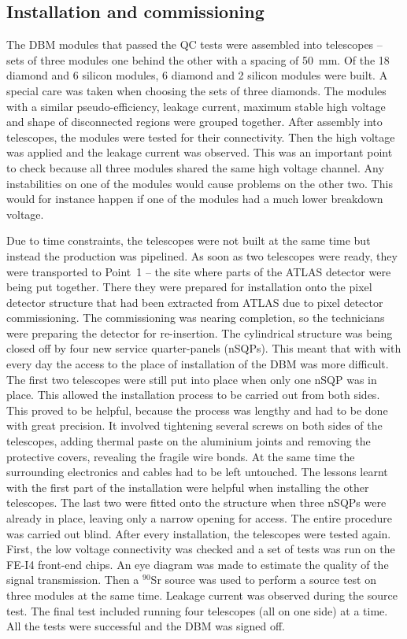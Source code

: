 \subsection{Installation and commissioning}
The DBM modules that passed the QC tests were assembled into telescopes -- sets of three modules one behind the other with a spacing of 50~mm. Of the 18 diamond and 6 silicon modules, 6 diamond and 2 silicon modules were built. A special care was taken when choosing the sets of three diamonds. The modules with a similar pseudo-efficiency, leakage current, maximum stable high voltage and shape of disconnected regions were grouped together. After assembly into telescopes, the modules were tested for their connectivity. Then the high voltage was applied and the leakage current was observed. This was an important point to check because all three modules shared the same high voltage channel. Any instabilities on one of the modules would cause problems on the other two. This would for instance happen if one of the modules had a much lower breakdown voltage.

Due to time constraints, the telescopes were not built at the same time but instead the production was pipelined. As soon as two telescopes were ready, they were transported to Point~1 -- the site where parts of the ATLAS detector were being put together. There they were prepared for installation onto the pixel detector structure that had been extracted from ATLAS due to pixel detector commissioning. The commissioning was nearing completion, so the technicians were preparing the detector for re-insertion. The cylindrical structure was being closed off by four new service quarter-panels (nSQPs). This meant that with with every day the access to the place of installation of the DBM was more difficult. The first two telescopes were still put into place when only one nSQP was in place. This allowed the installation process to be carried out from both sides. This proved to be helpful, because the process was lengthy and had to be done with great precision. It involved tightening several screws on both sides of the telescopes, adding thermal paste on the aluminium joints and removing the protective covers, revealing the fragile wire bonds. At the same time the surrounding electronics and cables had to be left untouched. The lessons learnt with the first part of the installation were helpful when installing the other telescopes. The last two were fitted onto the structure when three nSQPs were already in place, leaving only a narrow opening for access. The entire procedure was carried out blind. After every installation, the telescopes were tested again. First, the low voltage connectivity was checked and a set of tests was run on the FE-I4 front-end chips. An eye diagram was made to estimate the quality of the signal transmission. Then a $^{90}$Sr source was used to perform a source test on three modules at the same time. Leakage current was observed during the source test. The final test included running four telescopes (all on one side) at a time. All the tests were successful and the DBM was signed off.


